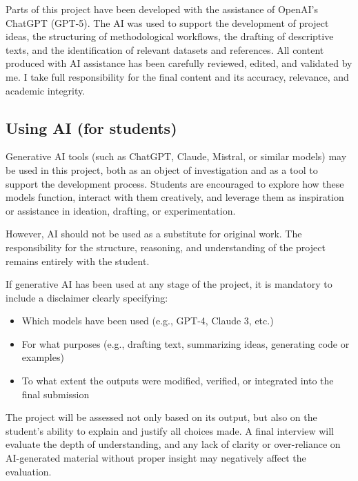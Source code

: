 \documentclass[11pt,a4paper]{article}
\begin{document}
\label{sec:ai-disclaimer}

Parts of this project have been developed with the assistance of OpenAI's ChatGPT (GPT-5). The AI was used to support the development of project ideas, the structuring of methodological workflows, the drafting of descriptive texts, and the identification of relevant datasets and references. All content produced with AI assistance has been carefully reviewed, edited, and validated by me. I take full responsibility for the final content and its accuracy, relevance, and academic integrity.

\subsection*{Using AI (for students)}
Generative AI tools (such as ChatGPT, Claude, Mistral, or similar models) may be used in this project, both as an object of investigation and as a tool to support the development process. Students are encouraged to explore how these models function, interact with them creatively, and leverage them as inspiration or assistance in ideation, drafting, or experimentation.

However, AI should not be used as a substitute for original work. The responsibility for the structure, reasoning, and understanding of the project remains entirely with the student.

If generative AI has been used at any stage of the project, it is mandatory to include a disclaimer clearly specifying:
\begin{itemize}
    \item Which models have been used (e.g., GPT-4, Claude 3, etc.)
    \item For what purposes (e.g., drafting text, summarizing ideas, generating code or examples)
    \item To what extent the outputs were modified, verified, or integrated into the final submission
\end{itemize}

The project will be assessed not only based on its output, but also on the student's ability to explain and justify all choices made. A final interview will evaluate the depth of understanding, and any lack of clarity or over-reliance on AI-generated material without proper insight may negatively affect the evaluation.
\end{document}
